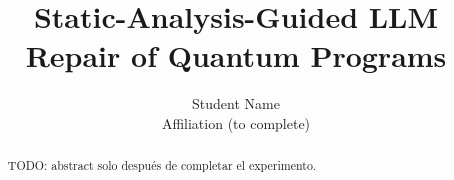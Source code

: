 \documentclass[11pt,a4paper]{article}
\title{Static-Analysis-Guided LLM Repair of Quantum Programs}
\author{Student Name \\ Affiliation (to complete)}
\date{}
\begin{document}
\maketitle
\begin{abstract}
TODO: abstract solo después de completar el experimento.
\end{abstract}











\end{document}
